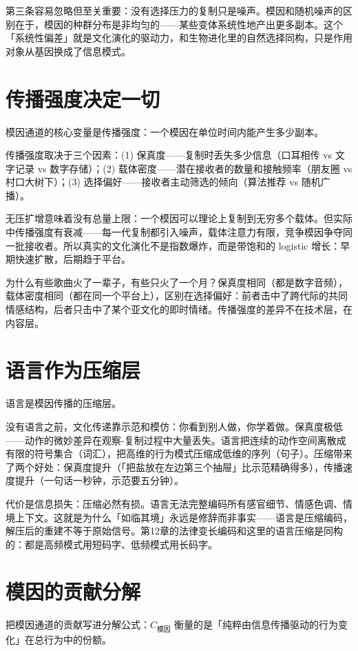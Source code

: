 \documentclass[../../main2.tex]{subfiles}
\begin{document}
	第三条容易忽略但至关重要：没有选择压力的复制只是噪声。模因和随机噪声的区别在于，模因的种群分布是非均匀的——某些变体系统性地产出更多副本。这个「系统性偏差」就是文化演化的驱动力，和生物进化里的自然选择同构，只是作用对象从基因换成了信息模式。
	\section{传播强度决定一切}
	模因通道的核心变量是传播强度：一个模因在单位时间内能产生多少副本。

	传播强度取决于三个因素：(1) 保真度——复制时丢失多少信息（口耳相传 vs 文字记录 vs 数字存储）；(2) 载体密度——潜在接收者的数量和接触频率（朋友圈 vs 村口大树下）；(3) 选择偏好——接收者主动筛选的倾向（算法推荐 vs 随机广播）。

	无压扩增意味着没有总量上限：一个模因可以理论上复制到无穷多个载体。但实际中传播强度有衰减——每一代复制都引入噪声，载体注意力有限，竞争模因争夺同一批接收者。所以真实的文化演化不是指数爆炸，而是带饱和的 logistic 增长：早期快速扩散，后期趋于平台。

	\begin{readingnote}
		为什么有些歌曲火了一辈子，有些只火了一个月？保真度相同（都是数字音频），载体密度相同（都在同一个平台上），区别在选择偏好：前者击中了跨代际的共同情感结构，后者只击中了某个亚文化的即时情绪。传播强度的差异不在技术层，在内容层。
	\end{readingnote}
	\section{语言作为压缩层}
	语言是模因传播的压缩层。

	没有语言之前，文化传递靠示范和模仿：你看到别人做，你学着做。保真度极低——动作的微妙差异在观察-复制过程中大量丢失。语言把连续的动作空间离散成有限的符号集合（词汇），把高维的行为模式压缩成低维的序列（句子）。压缩带来了两个好处：保真度提升（「把盐放在左边第三个抽屉」比示范精确得多），传播速度提升（一句话一秒钟，示范要五分钟）。

	代价是信息损失：压缩必然有损。语言无法完整编码所有感官细节、情感色调、情境上下文。这就是为什么「如临其境」永远是修辞而非事实——语言是压缩编码，解压后的重建不等于原始信号。第12章的法律变长编码和这里的语言压缩是同构的：都是高频模式用短码字、低频模式用长码字。
	\section{模因的贡献分解}
	把模因通道的贡献写进分解公式：$C_{\text{模因}}$ 衡量的是「纯粹由信息传播驱动的行为变化」在总行为中的份额。
\end{document}
